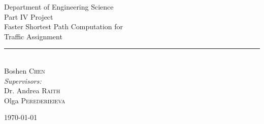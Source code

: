 \begin{titlepage}
    \newcommand{\HRule}{\rule{\linewidth}{0.5mm}}
    \centering
    {\LARGE Department of Engineering Science}\\[2em]
    {\LARGE Part IV Project}\\[8em]
    { \Huge Faster Shortest Path Computation for \\[.5em]Traffic Assignment
    }\\[2em]
    \HRule \\[5em]

    {\LARGE Boshen \textsc{Chen}} \\[10em]
    { \large
        \emph{Supervisors:} \\[.5em]
        Dr. Andrea \textsc{Raith} \\[.5em]
        Olga \textsc{Perederieieva}
    }

    \vfill
    {\large \mydate \today}
    \thispagestyle{empty}
\end{titlepage} 
